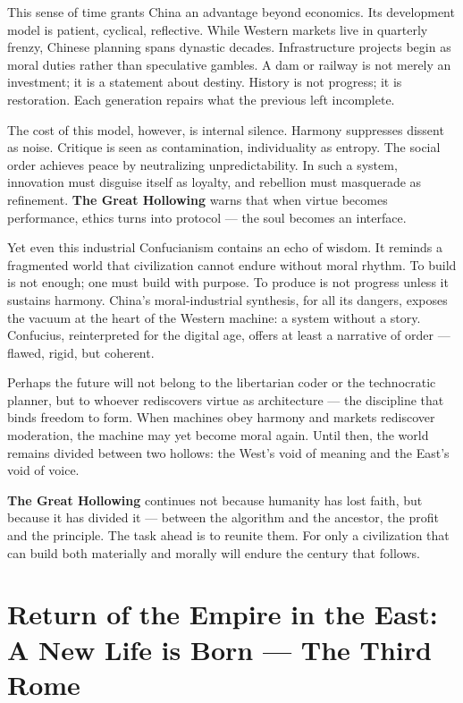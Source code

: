 \documentclass[11pt,twoside]{book}
\begin{document}
This sense of time grants China an advantage beyond economics.  
Its development model is patient, cyclical, reflective.  
While Western markets live in quarterly frenzy, Chinese planning spans dynastic decades.  
Infrastructure projects begin as moral duties rather than speculative gambles.  
A dam or railway is not merely an investment; it is a statement about destiny.  
History is not progress; it is restoration.  
Each generation repairs what the previous left incomplete.

The cost of this model, however, is internal silence.  
Harmony suppresses dissent as noise.  
Critique is seen as contamination, individuality as entropy.  
The social order achieves peace by neutralizing unpredictability.  
In such a system, innovation must disguise itself as loyalty, and rebellion must masquerade as refinement.  
\textbf{The Great Hollowing} warns that when virtue becomes performance, ethics turns into protocol — the soul becomes an interface.

Yet even this industrial Confucianism contains an echo of wisdom.  
It reminds a fragmented world that civilization cannot endure without moral rhythm.  
To build is not enough; one must build with purpose.  
To produce is not progress unless it sustains harmony.  
China’s moral-industrial synthesis, for all its dangers, exposes the vacuum at the heart of the Western machine: a system without a story.  
Confucius, reinterpreted for the digital age, offers at least a narrative of order — flawed, rigid, but coherent.

Perhaps the future will not belong to the libertarian coder or the technocratic planner, but to whoever rediscovers virtue as architecture — the discipline that binds freedom to form.  
When machines obey harmony and markets rediscover moderation, the machine may yet become moral again.  
Until then, the world remains divided between two hollows: the West’s void of meaning and the East’s void of voice.

\textbf{The Great Hollowing} continues not because humanity has lost faith, but because it has divided it — between the algorithm and the ancestor, the profit and the principle.  
The task ahead is to reunite them.  
For only a civilization that can build both materially and morally will endure the century that follows.

% 
\chapter{Return of the Empire in the East: A New Life is Born — The Third Rome}
\label{ch:30}
\end{document}
